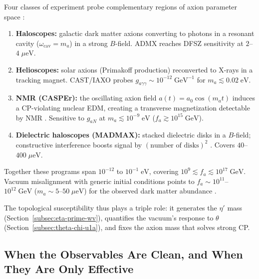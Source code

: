 Four classes of experiment probe complementary regions of axion parameter space \cite{Marsh2016AxionCosmology}:

\begin{enumerate}
  \item \textbf{Haloscopes:} galactic dark matter axions converting to photons in a resonant cavity ($\omega_{\mathrm{cav}} = m_a$) in a strong $B$-field.  ADMX \cite{ADMXOverviewPlaceholder} reaches DFSZ sensitivity at $2$--$4\;\mu\mathrm{eV}$.

  \item \textbf{Helioscopes:} solar axions (Primakoff production) reconverted to X-rays in a tracking magnet.  CAST/IAXO \cite{CASTIAXOOverviewPlaceholder} probes $g_{a\gamma\gamma}\sim 10^{-12}\;\mathrm{GeV}^{-1}$ for $m_a\lesssim 0.02\;\mathrm{eV}$.

  \item \textbf{NMR (CASPEr):} the oscillating axion field $a(t) = a_0\cos(m_a t)$ induces a CP-violating nuclear EDM, creating a transverse magnetization detectable by NMR \cite{CASPErOverviewPlaceholder}.  Sensitive to $g_{aN}$ at $m_a\lesssim 10^{-9}\;\mathrm{eV}$ ($f_a\gtrsim 10^{15}\;\mathrm{GeV}$).

  \item \textbf{Dielectric haloscopes (MADMAX):} stacked dielectric disks in a $B$-field; constructive interference boosts signal by $(\text{number of disks})^2$ \cite{MADMAXOverviewPlaceholder}.  Covers $40$--$400\;\mu\mathrm{eV}$.
\end{enumerate}

\noindent Together these programs span $10^{-12}$ to $10^{-1}\;\mathrm{eV}$, covering $10^{9}\lesssim f_a \lesssim 10^{17}\;\mathrm{GeV}$.  Vacuum misalignment with generic initial conditions points to $f_a\sim 10^{11}$--$10^{12}\;\mathrm{GeV}$ ($m_a\sim 5$--$50\;\mu\mathrm{eV}$) for the observed dark matter abundance \cite{Marsh2016AxionCosmology}.

\medskip

\noindent The topological susceptibility thus plays a triple role: it generates the $\eta'$ mass (Section~\ref{subsec:eta-prime-wv}), quantifies the vacuum's response to $\theta$ (Section~\ref{subsec:theta-chi-u1a}), and fixes the axion mass that solves strong CP.

\subsection{When the Observables Are Clean, and When They Are Only Effective}
\label{subsec:qcd-caveats}


